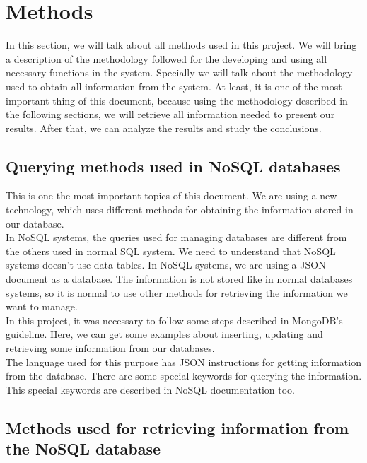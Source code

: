 \section{Methods}

In this section, we will talk about all methods used in this project. We will bring a description of the methodology followed for the developing and using all necessary functions in the system. Specially we will talk about the methodology used to obtain all information from the system. At least, it is one of the most important thing of this document, because using the methodology described in the following sections, we will retrieve all information needed to present our results. After that, we can analyze the results and study the conclusions.

\subsection{Querying methods used in NoSQL databases}

This is one the most important topics of this document. We are using a new technology, which uses different methods for obtaining the information stored in our database.\\

In NoSQL systems, the queries used for managing databases are different from the others used in normal SQL system. We need to understand that NoSQL systems doesn't use data tables. In NoSQL systems, we are using a JSON document as a database. The information is not stored like in normal databases systems, so it is normal to use other methods for retrieving the information we want to manage.\\

In this project, it was necessary to follow some steps described in MongoDB's guideline. Here, we can get some examples about inserting, updating and retrieving some information from our databases.\\

The language used for this purpose has JSON instructions for getting information from the database. There are some special keywords for querying the information. This special keywords are described in NoSQL documentation too.

\subsection{Methods used for retrieving information from the NoSQL database}

